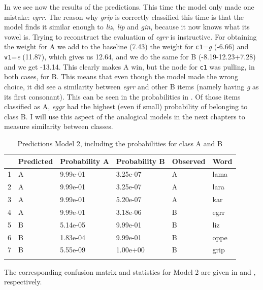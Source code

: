 In  we see now the results of the predictions. This time the model only made one mistake: \textit{egrr}. The reason why \textit{grip} is correctly classified this time is that the model finds it similar enough to \textit{liz}, \textit{lip} and \textit{gin}, because it now knows what its vowel is. Trying to reconstruct the evaluation of \textit{egrr} is instructive. For obtaining the weight for A we add to the baseline (7.43) the weight for \texttt{c1}=\textit{g} (-6.66) and \texttt{v1}=\textit{e} (11.87), which gives us 12.64, and we do the same for B (-8.19-12.23+7.28) and we get -13.14. This clearly makes A win, but the node for \texttt{c1} was pulling, in both cases, for B. This means that even though the model made the wrong choice, it did see a similarity between \textit{egrr} and other B items (namely having \textit{g} as its first consonant). This can be seen in the probabilities in . Of those items classified as A, \textit{eggr} had the highest (even if small) probability of belonging to class B. I will use this aspect of the analogical models in the next chapters to measure similarity between classes.

\begin{table}[!htpb]
  \centering
  \begin{tabular}{llllll}
    \lsptoprule
      & Predicted & Probability A & Probability B & Observed & Word \\
    \midrule
    1 & A         & 9.99e-01      & 3.25e-07      & A        & lama \\
    2 & A         & 9.99e-01      & 3.25e-07      & A        & lara \\
    3 & A         & 9.99e-01      & 5.20e-07      & A        & kar  \\
    4 & A         & 9.99e-01      & 3.18e-06      & B        & egrr \\
    5 & B         & 5.14e-05      & 9.99e-01      & B        & liz  \\
    6 & B         & 1.83e-04      & 9.99e-01      & B        & oppe \\
    7 & B         & 5.55e-09      & 1.00e+00      & B        & grip \\
    \lspbottomrule
  \end{tabular}
  \caption{Predictions Model 2, including the probabilities for class A and B}\label{tab:preds-model2}
\end{table}

The corresponding confusion matrix and statistics for Model 2 are given in  and , respectively.

